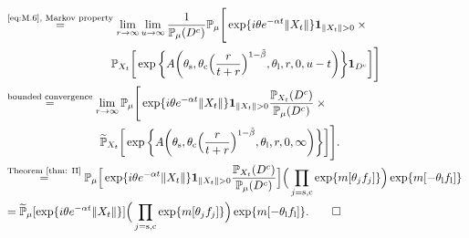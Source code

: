 \documentclass{amse-new}
\numberwithin{equation}{section}
\begin{document}
\begin{prof}
\begin{align}
	\\&
\begin{multlined}
	\overset{\text{\eqref{eq:M.6}, Markov property}}=\lim_{r\to \infty}\lim_{u\rightarrow\infty}\frac{1}{\mathbb P_{\mu}(D^c)} \mathbb P_{\mu}\Bigg[\exp\{ i\theta e^{-\alpha t}\|X_t\|\}\mathbf 1_{\|X_t\|>0} \times {}
	\\ \mathbb P_{X_t}\bigg[\exp\bigg\{A\bigg(\theta_\mathrm s,\theta_\mathrm c\Big(\frac{r}{t+r}\Big)^{1-\tilde \beta},\theta_\mathrm l,r,0,u-t\bigg)\bigg\}\mathbf 1_{D^c}\bigg]\Bigg]
\end{multlined}
	\\&\begin{multlined}\overset{\text{bounded convergence}}=\lim_{r\to \infty} \mathbb P_{\mu}\Bigg[\exp\{ i\theta e^{-\alpha t}\|X_t\|\} \mathbf 1_{\|X_t\|>0}\frac{\mathbb P_{X_t}(D^c)}{\mathbb P_{\mu}(D^c)} \times {}
	\\\widetilde{\mathbb P}_{X_t}\bigg[\exp\bigg\{A\bigg(\theta_\mathrm s,\theta_\mathrm c\Big(\frac{r}{t+r}\Big)^{1-\tilde \beta},\theta_\mathrm l,r,0,\infty\bigg)\bigg\}\bigg]\Bigg].
\end{multlined}
	\\& \overset{\text{Theorem \ref{thm: II}}}=  \mathbb P_{\mu}\Big[\exp\{ i\theta e^{-\alpha t}\|X_t\|\} \mathbf 1_{\|X_t\|>0}\frac{\mathbb P_{X_t}(D^c)}{\mathbb P_{\mu}(D^c)} \Big]\Big(\prod_{j=\mathrm s,\mathrm c}\exp\{m[\theta_j f_j]\}\Big)\exp\{m[-\theta_\mathrm l f_\mathrm l]\}
	\\&=\widetilde{\mathbb P}_{\mu}[\exp\{i\theta e^{-\alpha t}\|X_t\|\}]
	\Big(\prod_{j=\mathrm s,\mathrm c}\exp\{m[\theta_j f_j]\}\Big)\exp\{m[-\theta_\mathrm l f_\mathrm l]\}.
	\qedhere
\end{align}
\end{prof}

\end{document}

